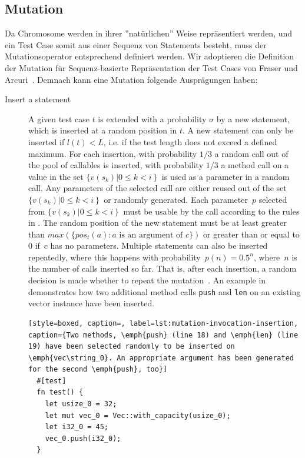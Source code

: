 \documentclass[paper=a4,%
  twoside,%
  BCOR4mm,%
  abstract=true,%
  toc=bibliography,%
  chapterprefix=true,%
  toc=bibliographynumbered,%
  open=right,%
  english,%
  pagesize=pdftex]{scrreprt}
\begin{document}
\subsection{Mutation}
Da Chromosome werden in ihrer ''natürlichen'' Weise repräsentiert werden, und ein Test Case somit aus einer Sequenz von Statements besteht, muss der Mutationsoperator entsprechend definiert werden. Wir adoptieren die Definition der Mutation für Sequenz-basierte Repräsentation der Test Cases von Fraser und Arcuri~\cite{Fraser2012}. Demnach kann eine Mutation folgende Ausprägungen haben:
\begin{description}
  \item[Insert a statement] A given test case $t$ is extended with a probability $\sigma$ by a new statement, which is inserted at a random position in $t$. A new statement can only be inserted if $l(t) < L$, i.e. if the test length does not exceed a defined maximum. For each insertion, with probability $1/3$ a random call out of the pool of callables is inserted, with probability $1/3$ a method call on a value in the set $\{v(s_k) \left| 0 \leq k < i \right\}$ is used as a parameter in a random call. Any parameters of the selected call are either reused out of the set $\{v(s_k) \left| 0 \leq k < i \right\}$ or randomly generated. Each parameter~$p$ selected from $\{v(s_k) \left| 0 \leq k < i \right\}$ must be usable by the call according to the rules in . The random position of the new statement must be at least greater than $max(\{pos_t(a) : a \text{ is an argument of } c\})$ or greater than or equal to $0$ if~$c$ has no parameters. Multiple statements can also be inserted repeatedly, where this happens with probability~$p(n) = 0.5^n$, where~$n$ is the number of calls inserted so far. That is, after each insertion, a random decision is made whether to repeat the mutation~\cite{Tonella2004}. An example in  demonstrates how two additional method calls \texttt{push} and \texttt{len} on an existing vector instance have been inserted. 

  \begin{lstlisting}[style=boxed, caption=, label=lst:mutation-invocation-insertion, caption={Two methods, \emph{push} (line 18) and \emph{len} (line 19) have been selected randomly to be inserted on \emph{vec\string_0}. An appropriate argument has been generated for the second \emph{push}, too}]
  #[test]
  fn test() {
    let usize_0 = 32;
    let mut vec_0 = Vec::with_capacity(usize_0);
    let i32_0 = 45;
    vec_0.push(i32_0);
  }


\end{lstlisting}
\end{description}
\end{document}
